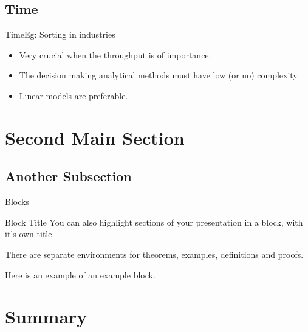 \documentclass{beamer}
\begin{document}
\subsection{Time}

\begin{frame}{Time}{Eg: Sorting in industries}
  \begin{itemize}
  \item Very crucial when the throughput is of importance.
  \item The decision making analytical methods must have low (or no) complexity.
  \item Linear models are preferable.
  \end{itemize}
\end{frame}


\section{Second Main Section}

\subsection{Another Subsection}

\begin{frame}{Blocks}
\begin{block}{Block Title}
You can also highlight sections of your presentation in a block, with it's own title
\end{block}
\begin{theorem}
There are separate environments for theorems, examples, definitions and proofs.
\end{theorem}
\begin{example}
Here is an example of an example block.
\end{example}
\end{frame}

\section*{Summary}
\end{document}
